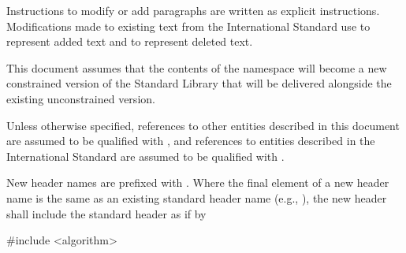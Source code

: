 \pnum
Instructions to modify or add paragraphs are written as explicit instructions.
Modifications made to existing text from the International Standard use
 to represent added text and  to
represent deleted text.

\pnum
This document assumes that the contents of the 
namespace will become a new constrained version of the \Cpp Standard Library
that will be delivered alongside the existing unconstrained version.

\pnum
Unless otherwise specified, references to other entities described in this
document are assumed to be qualified with , and
references to entities described in the International Standard are assumed to be
qualified with .

\pnum
New header names are prefixed with . Where
the final element of a new header name is the same as an existing standard header
name (e.g., ), the new header shall include
the standard header as if by

\begin{codeblock}
#include <algorithm>
\end{codeblock}

